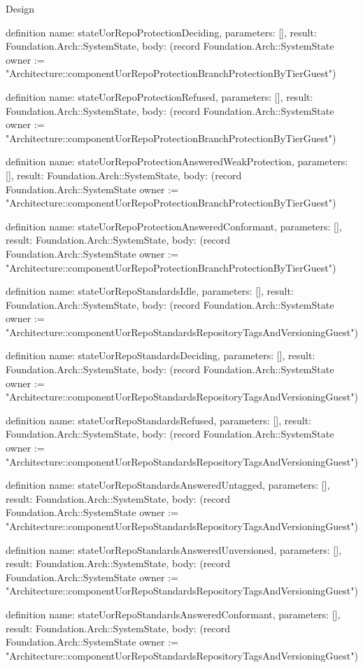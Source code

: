 \begin{lexlean}{Design}
\begin{semanticmodule}
definition{
  name: stateUorRepoProtectionDeciding,
  parameters: [],
  result: Foundation.Arch::SystemState,
  body: (record Foundation.Arch::SystemState {owner := "Architecture::componentUorRepoProtectionBranchProtectionByTierGuest"})
}

definition{
  name: stateUorRepoProtectionRefused,
  parameters: [],
  result: Foundation.Arch::SystemState,
  body: (record Foundation.Arch::SystemState {owner := "Architecture::componentUorRepoProtectionBranchProtectionByTierGuest"})
}

definition{
  name: stateUorRepoProtectionAnsweredWeakProtection,
  parameters: [],
  result: Foundation.Arch::SystemState,
  body: (record Foundation.Arch::SystemState {owner := "Architecture::componentUorRepoProtectionBranchProtectionByTierGuest"})
}

definition{
  name: stateUorRepoProtectionAnsweredConformant,
  parameters: [],
  result: Foundation.Arch::SystemState,
  body: (record Foundation.Arch::SystemState {owner := "Architecture::componentUorRepoProtectionBranchProtectionByTierGuest"})
}

definition{
  name: stateUorRepoStandardsIdle,
  parameters: [],
  result: Foundation.Arch::SystemState,
  body: (record Foundation.Arch::SystemState {owner := "Architecture::componentUorRepoStandardsRepositoryTagsAndVersioningGuest"})
}

definition{
  name: stateUorRepoStandardsDeciding,
  parameters: [],
  result: Foundation.Arch::SystemState,
  body: (record Foundation.Arch::SystemState {owner := "Architecture::componentUorRepoStandardsRepositoryTagsAndVersioningGuest"})
}

definition{
  name: stateUorRepoStandardsRefused,
  parameters: [],
  result: Foundation.Arch::SystemState,
  body: (record Foundation.Arch::SystemState {owner := "Architecture::componentUorRepoStandardsRepositoryTagsAndVersioningGuest"})
}

definition{
  name: stateUorRepoStandardsAnsweredUntagged,
  parameters: [],
  result: Foundation.Arch::SystemState,
  body: (record Foundation.Arch::SystemState {owner := "Architecture::componentUorRepoStandardsRepositoryTagsAndVersioningGuest"})
}

definition{
  name: stateUorRepoStandardsAnsweredUnversioned,
  parameters: [],
  result: Foundation.Arch::SystemState,
  body: (record Foundation.Arch::SystemState {owner := "Architecture::componentUorRepoStandardsRepositoryTagsAndVersioningGuest"})
}

definition{
  name: stateUorRepoStandardsAnsweredConformant,
  parameters: [],
  result: Foundation.Arch::SystemState,
  body: (record Foundation.Arch::SystemState {owner := "Architecture::componentUorRepoStandardsRepositoryTagsAndVersioningGuest"})
}


\end{semanticmodule}
\end{lexlean}
